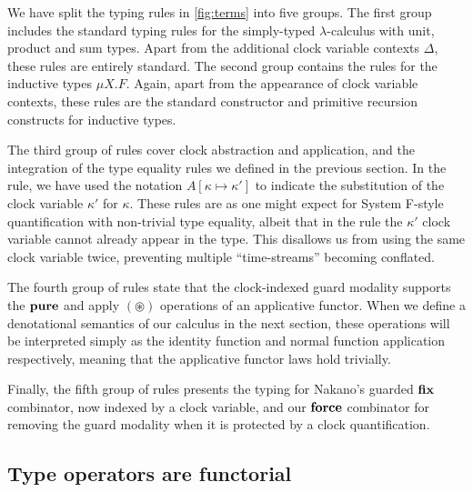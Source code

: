We have split the typing rules in \autoref{fig:terms} into five
groups. The first group includes the standard typing rules for the
simply-typed $\lambda$-calculus with unit, product and sum
types. Apart from the additional clock variable contexts $\Delta$,
these rules are entirely standard. The second group contains the rules
for the inductive types $\mu X. F$. Again, apart from the appearance
of clock variable contexts, these rules are the standard constructor
and primitive recursion constructs for inductive types.

The third group of rules cover clock abstraction and application, and
the integration of the type equality rules we defined in the previous
section. In the  rule, we have used the notation
$A[\kappa \mapsto \kappa']$ to indicate the substitution of the clock
variable $\kappa'$ for $\kappa$. These rules are as one might expect
for System F-style quantification with non-trivial type equality,
albeit that in the  rule the $\kappa'$ clock
variable cannot already appear in the type. This disallows us from
using the same clock variable twice, preventing multiple
``time-streams'' becoming conflated.

The fourth group of rules state that the clock-indexed guard modality
supports the $\textbf{pure}$ and apply $(\mathord\circledast)$ operations
of an applicative functor. When we define a denotational semantics of
our calculus in the next section, these operations will be interpreted
simply as the identity function and normal function application
respectively, meaning that the applicative functor laws hold
trivially.

Finally, the fifth group of rules presents the typing for Nakano's
guarded $\textbf{fix}$ combinator, now indexed by a clock variable, and
our $\textbf{force}$ combinator for removing the guard modality when it is
protected by a clock quantification.

\subsection{Type operators are functorial}
\label{sec:functorial}

\newcommand{\ora}[1]{\overrightarrow{#1}}

